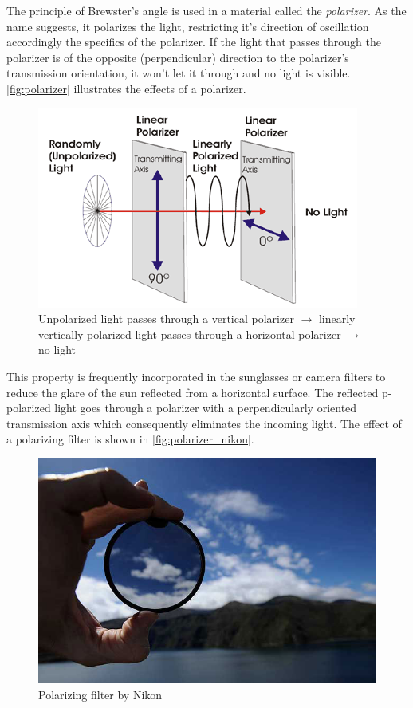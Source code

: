 The principle of Brewster's angle is used in a material called the \emph{polarizer}. As the name suggests, it polarizes the light, restricting it's direction of oscillation accordingly the specifics of the polarizer. If the light that passes through the polarizer is of the opposite (perpendicular) direction to the polarizer's transmission orientation, it won't let it through and no light is visible. \autoref{fig:polarizer} illustrates the effects of a polarizer.

\begin{figure}[h]
	\centering
	\includegraphics[width=.6\linewidth]{img/polarizer.png}
	\caption[nikon]{Unpolarized light passes through a vertical polarizer $\rightarrow$ linearly vertically polarized light passes through a horizontal polarizer $\rightarrow$ no light\footnotemark}
	\label{fig:polarizer}
\end{figure}

This property is frequently incorporated in the sunglasses or camera filters to reduce the glare of the sun reflected from a horizontal surface. The reflected p-polarized light goes through a polarizer with a perpendicularly oriented transmission axis which consequently eliminates the incoming light. The effect of a polarizing filter is shown in \autoref{fig:polarizer_nikon}.

\begin{figure}[h]
	\centering
	\includegraphics[width=.7\linewidth]{img/polarizer_nikon.jpg}
	\caption[nikon]{Polarizing filter by Nikon\footnotemark}
	\label{fig:polarizer_nikon}
\end{figure}

